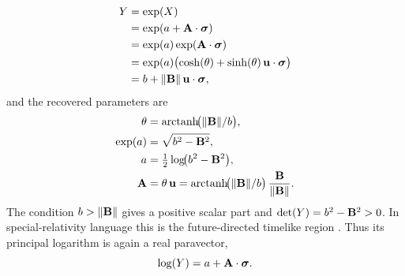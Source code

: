 \begin{align*}
Y
&=\exp(X)\notag \\
&=\exp(a+\mathbf{A}\cdot\mathbf{\bm{\sigma}})\notag \\
&=\exp(a)\exp(\mathbf{A}\cdot\mathbf{\bm{\sigma}})\notag \\
&=\exp(a)\bigl(\cosh(\theta)+\sinh(\theta)\,\mathbf{u}\cdot\mathbf{\bm{\sigma}}\bigr)\notag \\
&=b+\lVert\mathbf{B}\rVert\,\mathbf{u}\cdot\mathbf{\bm{\sigma}},
\end{align*}
and the recovered parameters are
\begin{align*}
\theta &= \operatorname{arctanh}\!\bigl(\lVert\mathbf{B}\rVert/b\bigr), \\
\exp(a) &= \sqrt{b^{2}-\mathbf{B}^{2}}, \\
a &= \tfrac12 \log\!\bigl(b^{2}-\mathbf{B}^{2}\bigr), \\
\mathbf{A} &= \theta\,\mathbf{u}
= \operatorname{arctanh}\!\bigl(\lVert\mathbf{B}\rVert/b\bigr)\,
\frac{\mathbf{B}}{\lVert\mathbf{B}\rVert}.
\end{align*}
The condition \(b>\lVert\mathbf{B}\rVert\) gives a positive scalar part and
\(\operatorname{det}\!\left(Y\right)=b^2-\mathbf{B}^2>0\). In special-relativity language this is
the future-directed timelike region \cite{minkowski1908,einstein1905}.
Thus its principal logarithm is again a real paravector,
\begin{equation*}
\log(Y)=a+\mathbf{A}\cdot\mathbf{\bm{\sigma}}.
\end{equation*}


